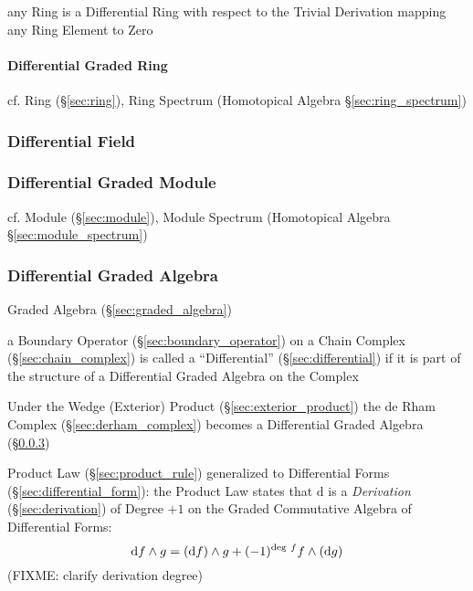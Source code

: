 any Ring is a Differential Ring with respect to the Trivial Derivation mapping
any Ring Element to Zero



\paragraph{Differential Graded Ring}\label{sec:differential_graded_ring}\hfill

cf. Ring (\S\ref{sec:ring}), Ring Spectrum (Homotopical Algebra
\S\ref{sec:ring_spectrum})



\subsubsection{Differential Field}\label{sec:differential_field}

\subsubsection{Differential Graded Module}\label{sec:differential_graded_module}

cf. Module (\S\ref{sec:module}), Module Spectrum (Homotopical Algebra
\S\ref{sec:module_spectrum})



\subsubsection{Differential Graded Algebra}
\label{sec:differential_graded_algebra}

Graded Algebra (\S\ref{sec:graded_algebra})

a Boundary Operator (\S\ref{sec:boundary_operator}) on a Chain Complex
(\S\ref{sec:chain_complex}) is called a ``Differential''
(\S\ref{sec:differential}) if it is part of the structure of a Differential
Graded Algebra on the Complex

Under the Wedge (Exterior) Product (\S\ref{sec:exterior_product}) the de Rham
Complex (\S\ref{sec:derham_complex}) becomes a Differential Graded Algebra
(\S\ref{sec:differential_graded_algebra})

Product Law (\S\ref{sec:product_rule}) generalized to Differential Forms
(\S\ref{sec:differential_form}): the Product Law states that $\mathrm{d}$ is a
\emph{Derivation} (\S\ref{sec:derivation}) of Degree $+1$ on the Graded
Commutative Algebra of Differential Forms:
\[
\mathrm{d}f \wedge g = (\mathrm{d}f) \wedge g +
  (-1)^{\mathrm{deg}\ f}f \wedge (\mathrm{d}g)
\]
(FIXME: clarify derivation degree)



